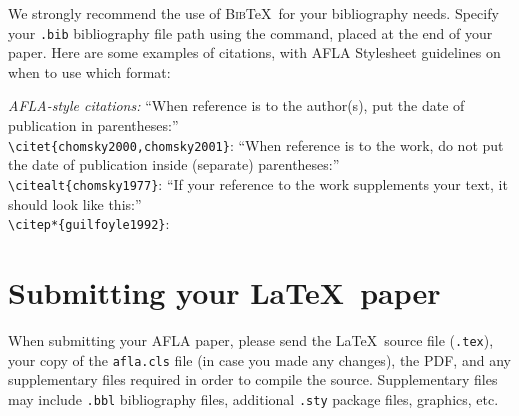 \documentclass{afla}
\begin{document}
We strongly recommend the use of \textsc{Bib}\TeX\ for your bibliography needs. Specify your \verb`.bib` bibliography file path using the \verb`` command, placed at the end of your paper. Here are some examples of citations, with AFLA Stylesheet guidelines on when to use which format:

\pex \textit{AFLA-style citations:}
	\a ``When reference is to the author(s), put the date of publication in parentheses:''\\
		\verb`\citet{chomsky2000,chomsky2001}`: \citet{chomsky2000,chomsky2001}
	\a ``When reference is to the work, do not put the date of publication inside (separate) parentheses:''\\
		\verb`\citealt{chomsky1977}`: \citealt{chomsky1977}
	\a ``If your reference to the work supplements your text, it should look like this:''\\
		\verb`\citep*{guilfoyle1992}`: \citep*{guilfoyle1992}
\xe


\section{Submitting your \LaTeX\ paper}

When submitting your AFLA paper, please send the \LaTeX\ source file (\verb`.tex`), your copy of the \verb`afla.cls` file (in case you made any changes), the PDF, and any supplementary files required in order to compile the source. Supplementary files may include \verb`.bbl` bibliography files, additional \verb`.sty` package files, graphics, etc.


\end{document}
